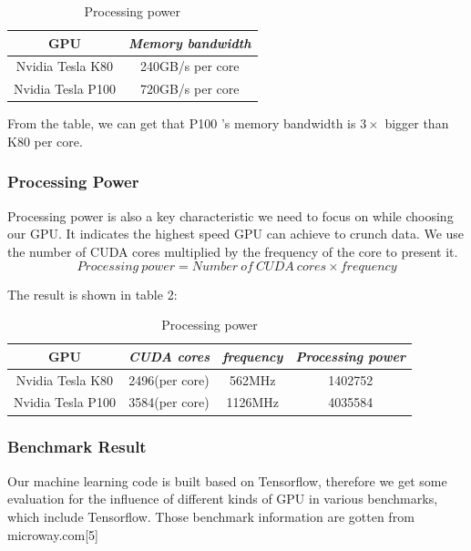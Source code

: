 \documentclass[conference]{IEEEtran}
\begin{document}
\begin{table}[H]
\caption{Processing power}
\begin{center}
\begin{tabular}{|c|c|}
\hline
\textbf{GPU} & \textbf{\textit{Memory bandwidth}}\\
\hline
Nvidia Tesla K80 & 240GB/s per core \\
\hline
Nvidia Tesla P100 & 720GB/s per core\\
\hline
\end{tabular}
\label{tab1}
\end{center}
\end{table}


From the table, we can get that P100 's memory bandwidth is $3 \times$ bigger than K80 per core. 

\subsubsection{Processing Power}
Processing power is also a key characteristic we need to focus on while choosing our GPU. It indicates the highest speed GPU can achieve to crunch data. We use the number of CUDA cores multiplied by the frequency of the core to present it.
$$Processing \ power = Number \ of \ CUDA \ cores \times frequency $$

The result is shown in table 2:

\begin{table}[H]
\caption{Processing power}
\begin{center}
\begin{tabular}{|c|c|c|c|}
\hline
\textbf{GPU} & \textbf{\textit{CUDA cores}}& \textbf{\textit{frequency}}& \textbf{\textit{Processing power}} \\
\hline
Nvidia Tesla K80 & 2496(per core)& 562MHz & 1402752 \\
\hline
Nvidia Tesla P100 & 3584(per core)& 1126MHz & 4035584 \\
\hline
\end{tabular}
\label{tab2}
\end{center}
\end{table}

\subsubsection{Benchmark Result}

Our machine learning code is built based on Tensorflow, therefore we get some evaluation for the influence of different kinds of GPU in various benchmarks, which include Tensorflow. Those benchmark information are gotten from microway.com[5]
\end{document}
